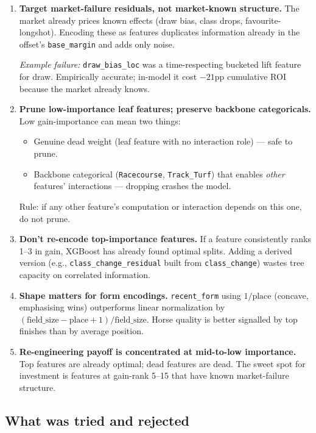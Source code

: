 \documentclass[11pt]{article}
\begin{document}
\begin{enumerate}\item \textbf{Target market-failure residuals, not market-known structure.}
      The market already prices known effects (draw bias, class drops,
      favourite-longshot). Encoding these as features duplicates
      information already in the offset's \texttt{base\_margin} and adds
      only noise.

      \emph{Example failure:} \texttt{draw\_bias\_loc} was a time-respecting
      bucketed lift feature for draw. Empirically accurate; in-model it
      cost $-21$pp cumulative ROI because the market already knows.
\item \textbf{Prune low-importance leaf features; preserve backbone
      categoricals.} Low gain-importance can mean two things:
      \begin{itemize}        \item Genuine dead weight (leaf feature with no interaction
              role) --- safe to prune.
        \item Backbone categorical (\texttt{Racecourse}, \texttt{Track\_Turf})
              that enables \emph{other} features' interactions ---
              dropping crashes the model.
      \end{itemize}
      Rule: if any other feature's computation or interaction depends
      on this one, do not prune.
\item \textbf{Don't re-encode top-importance features.} If a feature
      consistently ranks 1--3 in gain, XGBoost has already found
      optimal splits. Adding a derived version (e.g.,
      \texttt{class\_change\_residual} built from \texttt{class\_change})
      wastes tree capacity on correlated information.
\item \textbf{Shape matters for form encodings.} \texttt{recent\_form}
      using $1/\text{place}$ (concave, emphasising wins) outperforms
      linear normalization by $(\text{field\_size} - \text{place} + 1)/\text{field\_size}$.
      Horse quality is better signalled by top finishes than by
      average position.
\item \textbf{Re-engineering payoff is concentrated at mid-to-low
      importance.} Top features are already optimal; dead features
      are dead. The sweet spot for investment is features at gain-rank
      5--15 that have known market-failure structure.
\end{enumerate}

\subsection{What was tried and rejected}
\label{sec:rejected}
\end{document}
